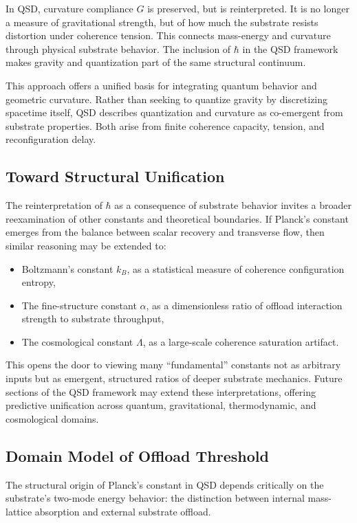 \documentclass[ht-mathphys]{ht-fmt}
\theoremstyle{thmstyleone}%
\theoremstyle{thmstyletwo}%
\theoremstyle{thmstylethree}%
\begin{document}
In QSD, curvature compliance $G$ is preserved, but is reinterpreted. It is no longer a measure of gravitational strength, but of how much the substrate resists distortion under coherence tension. This connects mass-energy and curvature through physical substrate behavior. The inclusion of $\hbar$ in the QSD framework makes gravity and quantization part of the same structural continuum.

This approach offers a unified basis for integrating quantum behavior and geometric curvature. Rather than seeking to quantize gravity by discretizing spacetime itself, QSD describes quantization and curvature as co-emergent from substrate properties. Both arise from finite coherence capacity, tension, and reconfiguration delay.

\subsection{Toward Structural Unification}

The reinterpretation of $\hbar$ as a consequence of substrate behavior invites a broader reexamination of other constants and theoretical boundaries. If Planck’s constant emerges from the balance between scalar recovery and transverse flow, then similar reasoning may be extended to:

\begin{itemize}
    \item Boltzmann’s constant $k_B$, as a statistical measure of coherence configuration entropy,
    \item The fine-structure constant $\alpha$, as a dimensionless ratio of offload interaction strength to substrate throughput,
    \item The cosmological constant $\Lambda$, as a large-scale coherence saturation artifact.
\end{itemize}

This opens the door to viewing many “fundamental” constants not as arbitrary inputs but as emergent, structured ratios of deeper substrate mechanics. Future sections of the QSD framework may extend these interpretations, offering predictive unification across quantum, gravitational, thermodynamic, and cosmological domains.

\subsection{Domain Model of Offload Threshold}

The structural origin of Planck’s constant in QSD depends critically on the substrate’s two-mode energy behavior: the distinction between internal mass-lattice absorption and external substrate offload.
\end{document}
